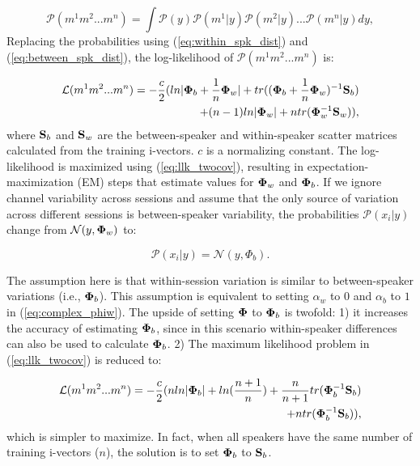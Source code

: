 \begin{equation}
\mathcal{P}(m^1 m^2 ... m^n) = \int \mathcal{P}(y) \mathcal{P}(m^1 | y) \mathcal{P}(m^2 | y) ... \mathcal{P}(m^n | y) dy,
\end{equation}
Replacing the probabilities using (\ref{eq:within_spk_dist}) and (\ref{eq:between_spk_dist}), the log-likelihood of $\mathcal{P}(m^1 m^2 ... m^n)$ is: 


\begin{equation}
\label{eq:llk_twocov}
\begin{split}
\mathcal{L}(m^1 m^2 ... m^n) = -\frac{c}{2}(ln | {\bf \Phi}_b + \frac{1}{n}{\bf \Phi}_w | + tr(({\bf \Phi}_b + \frac{1}{n}{\bf \Phi}_w)^{-1}{\bf S}_b) \\+ (n-1)ln|{\bf \Phi}_w| + ntr({\bf \Phi}_w^{-1}{\bf S}_w)),
\end{split}
\end{equation}
where ${\bf S}_b$ and ${\bf S}_w$ are the between-speaker and within-speaker scatter matrices calculated from the training i-vectors. $c$ is a normalizing constant. 
The log-likelihood is maximized using (\ref{eq:llk_twocov}), resulting in expectation-maximization (EM) steps that estimate values for ${\bf \Phi}_w$ and ${\bf \Phi}_b$. 
If we ignore channel variability across sessions and assume that the only source of variation across different sessions is between-speaker variability, the probabilities $\mathcal{P} (x_i | y)$ change from $\mathcal{N} (y,{\bf \Phi}_w)$ to: 

\begin{equation}
\mathcal{P} (x_i|y) = \mathcal{N} (y,\Phi_b).
\end{equation}

The assumption here is that within-session variation is similar to between-speaker variations (i.e., ${\bf \Phi}_b$). 
This assumption is equivalent to setting $\alpha_w$ to $0$ and $\alpha_b$ to $1$ in (\ref{eq:complex_phiw}). 
The upside of setting ${\bf \Phi}$ to ${\bf \Phi}_b$ is twofold: 1) it increases the accuracy of estimating ${\bf \Phi}_b$, since in this scenario within-speaker differences can also be used to calculate ${\bf \Phi}_b$. 2) The maximum likelihood problem in (\ref{eq:llk_twocov}) is reduced to:

\begin{equation}
\label{eq:llk_onecov}
\begin{split}
\mathcal{L}(m^1 m^2 ... m^n) = -\frac{c}{2}(nln | {\bf \Phi}_b | + ln(\frac{n+1}{n})+ \frac{n}{n+1}tr({\bf \Phi}_b^{-1}{\bf S}_b) \\+ ntr({\bf \Phi}_b^{-1}{\bf S}_b)),
\end{split}
\end{equation}
which is simpler to maximize. In fact, when all speakers have the same number of training i-vectors ($n$), the solution is to set ${\bf \Phi}_b$ to ${\bf S}_b$. 


